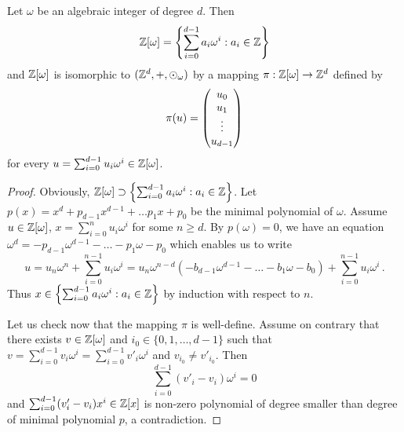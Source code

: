 \begin{lem}
Let  $\omega$ be an algebraic integer of degree $d$. Then
$$
\mathbb{Z}[\omega] =\left\{\sum_{i=0}^{d-1} a_i \omega^i : a_i\in\mathbb{Z} \right\}
$$ 
and $\mathbb{Z}[\omega]$ is isomorphic to $(\mathbb{Z}^d,+,\odot_\omega)$ by a mapping $\pi:\mathbb{Z}[\omega] \rightarrow \mathbb{Z}^{d}$ defined by 
$$
\pi(u)=\begin{pmatrix} {u}_0 \\ {u}_1 \\ \vdots \\ {u}_{d-1} \end{pmatrix}
$$
 for every $u=\sum_{i=0}^{d-1} u_i \omega^i \in \mathbb{Z}[\omega]$. 
\end{lem}
\begin{proof}
Obviously, $\mathbb{Z}[\omega] \supset \left\{\sum_{i=0}^{d-1} a_i \omega^i : a_i\in\mathbb{Z} \right\}$. Let $p(x)=x^d +p_{d-1}x^{d-1}+ \dots p_1 x+p_0$ be the minimal polynomial of $\omega$. Assume $u\in \mathbb{Z}[\omega]$, $x=\sum_{i=0}^n u_i \omega^i$ for some $n\geq d$.  By $p(\omega)=0$, we have an equation $\omega^d =-p_{d-1}\omega^{d-1}- \dots -p_1\omega-p_0$ which enables us to write
$$
u=u_n\omega^n + \sum_{i=0}^{n-1} u_i \omega^i=u_n \omega^{n-d}(-b_{d-1}\omega^{d-1}- \dots -b_1\omega-b_0)+ \sum_{i=0}^{n-1} u_i \omega^i\,.
$$
Thus $x\in \left\{\sum_{i=0}^{d-1} a_i \omega^i : a_i\in\mathbb{Z} \right\}$ by  induction with respect to $n$.

Let us check now that the mapping $\pi$ is well-define. Assume on contrary that there exists $v\in \mathbb{Z}[\omega]$ and $i_0\in\{0,1,\dots,d-1\}$ such that $v=\sum_{i=0}^{d-1} v_i \omega^i=\sum_{i=0}^{d-1} v'_i \omega^i$ and $v_{i_0} \neq v'_{i_0}$. Then
$$
    \sum_{i=0}^{d-1} (v'_i-v_i) \omega^i=0
$$
and $\sum_{i=0}^{d-1} (v'_i-v_i) x^i \in \mathbb{Z}[x]$ is non-zero polynomial of degree smaller than degree of minimal polynomial $p$, a contradiction.


\end{proof}

